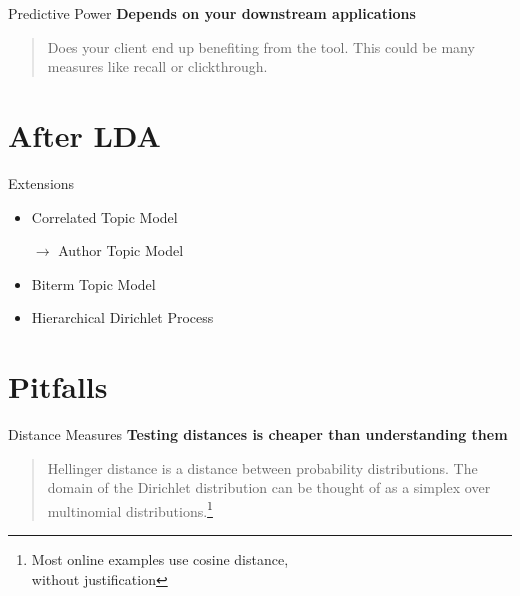 \documentclass[10pt]{beamer}
\begin{document}
\begin{frame}{Predictive Power}
  {\bf Depends on your downstream applications}

  \begin{quote}
    Does your client end up benefiting from the tool. This could be many measures like recall or clickthrough.
  \end{quote}
\end{frame}

\section{After LDA}
\begin{frame}{Extensions}
  \begin{itemize}
  \item Correlated Topic Model
  \item[$\rightarrow$] Author Topic Model
  \item Biterm Topic Model
  \item Hierarchical Dirichlet Process
  \end{itemize}
\end{frame}

\section{Pitfalls}

\begin{frame}{Distance Measures}
  {\bf Testing distances is cheaper than understanding them}

  \begin{quote}
    Hellinger distance is a distance between probability distributions. The domain of the Dirichlet distribution can be thought of as a simplex over multinomial distributions.\footnote{Most online examples use cosine distance, \\without justification}
  \end{quote}
\end{frame}
\end{document}
